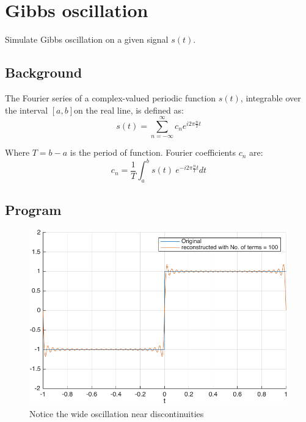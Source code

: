 \section{Gibbs oscillation}
Simulate Gibbs oscillation on a given signal $s(t)$.

\subsection*{Background}
The Fourier series of a complex-valued periodic function $s(t)$, integrable over the interval $[a, b]$on the real line, is defined as: 
$$s(t) = \sum _{n=-\infty }^{\infty }c_{n}e^{i2\pi {\tfrac {n}{T}}t}$$

Where $T = b - a$ is the period of function. Fourier coefficients $c_{n}$ are: 
$$c_{n}={\frac {1}{T}}\int _{a}^{b}s(t)\ e^{-i2\pi {\tfrac {n}{T}}t}dt$$


\subsection*{Program}

\begin{figure}[ht!]
	\centering
	\includegraphics[width=.5\textwidth]{img/Q4.pdf}
	\caption*{Notice the wide oscillation near discontinuities}
\end{figure}